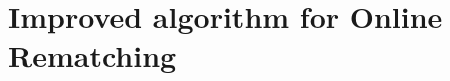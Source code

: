 \documentclass[manuscript,screen=true, review, anonymous]{acmart}
\begin{document}

\section{Improved algorithm for Online Rematching}
\label{sec:k2}
\end{document}

